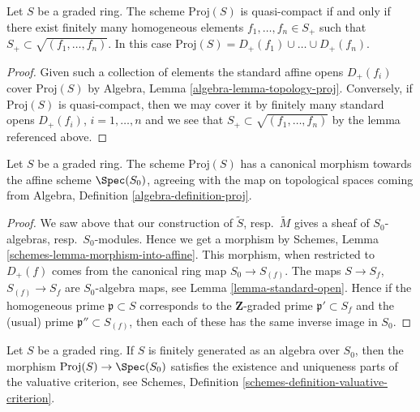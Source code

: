\begin{lemma}
\label{lemma-proj-quasi-compact}
Let $S$ be a graded ring.
The scheme $\text{Proj}(S)$ is quasi-compact if and only
if there exist finitely many homogeneous elements
$f_1, \ldots, f_n \in S_{+}$ such that
$S_{+} \subset \sqrt{(f_1, \ldots, f_n)}$. In this case
$\text{Proj}(S) = D_+(f_1) \cup \ldots \cup D_+(f_n)$.
\end{lemma}

\begin{proof}
Given such a collection of elements the standard affine opens
$D_{+}(f_i)$ cover $\text{Proj}(S)$ by
Algebra, Lemma \ref{algebra-lemma-topology-proj}.
Conversely, if $\text{Proj}(S)$ is quasi-compact, then we
may cover it by finitely many standard opens
$D_{+}(f_i)$, $i = 1, \ldots, n$ and we see that
$S_{+} \subset \sqrt{(f_1, \ldots, f_n)}$ by the
lemma referenced above.
\end{proof}

\begin{lemma}
\label{lemma-structure-morphism-proj}
Let $S$ be a graded ring. The scheme $\text{Proj}(S)$ has a canonical morphism
towards the affine scheme $\Spec(S_0)$, agreeing with the map on
topological spaces coming from
Algebra, Definition \ref{algebra-definition-proj}.
\end{lemma}

\begin{proof}
We saw above that our construction of $\widetilde S$,
resp.\ $\widetilde M$ gives a sheaf of $S_0$-algebras, resp.\ $S_0$-modules.
Hence we get a morphism by
Schemes, Lemma \ref{schemes-lemma-morphism-into-affine}.
This morphism, when restricted to $D_{+}(f)$ comes from the
canonical ring map $S_0 \to S_{(f)}$. The maps
$S \to S_f$, $S_{(f)} \to S_f$ are $S_0$-algebra maps, see
Lemma \ref{lemma-standard-open}.
Hence if the homogeneous prime $\mathfrak p \subset S$
corresponds to the $\mathbf{Z}$-graded prime $\mathfrak p' \subset S_f$
and the (usual) prime $\mathfrak p'' \subset S_{(f)}$, then
each of these has the same inverse image in $S_0$.
\end{proof}

\begin{lemma}
\label{lemma-proj-valuative-criterion}
Let $S$ be a graded ring. If $S$ is finitely generated as
an algebra over $S_0$, then
the morphism $\text{Proj}(S) \to \Spec(S_0)$ satisfies
the existence and uniqueness parts of the valuative criterion,
see Schemes, Definition \ref{schemes-definition-valuative-criterion}.
\end{lemma}

